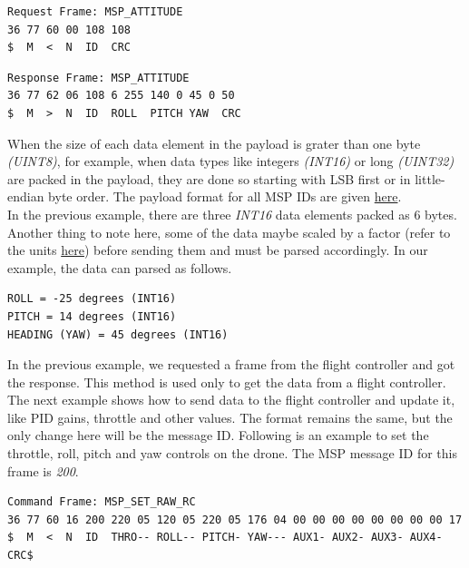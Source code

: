 \documentclass[a4paper,12pt,oneside]{book}
\begin{document}
\begin{verbatim}
Request Frame: MSP_ATTITUDE
36 77 60 00 108 108
$  M  <  N  ID  CRC
\end{verbatim}

\bigskip

\begin{verbatim}
Response Frame: MSP_ATTITUDE
36 77 62 06 108 6 255 140 0 45 0 50
$  M  >  N  ID  ROLL  PITCH YAW  CRC
\end{verbatim}

\clearpage

When the size of each data element in the payload is grater than one byte \textit{(UINT8)}, for example, when data types like integers \textit{(INT16)} or long \textit{(UINT32)} are packed in the payload, they are done so starting with LSB first or in little-endian byte order. The payload format for all MSP IDs are given \href{http://www.multiwii.com/wiki/index.php?title=Multiwii_Serial_Protocol}{here}.\\

In the previous example, there are three \textit{INT16} data elements packed as 6 bytes. Another thing to note here, some of the data maybe scaled by a factor (refer to the units \href{http://www.multiwii.com/wiki/index.php?title=Multiwii_Serial_Protocol}{here}) before sending them and must be parsed accordingly. In our example, the data can parsed as follows.\\

\begin{verbatim}
ROLL = -25 degrees (INT16)
PITCH = 14 degrees (INT16)
HEADING (YAW) = 45 degrees (INT16)
\end{verbatim}

\bigskip

In the previous example, we requested a frame from the flight controller and got the response. This method is used only to get the data from a flight controller. The next example shows how to send data to the flight controller and update it, like PID gains, throttle and other values. The format remains the same, but the only change here will be the message ID. Following is an example to set the throttle, roll, pitch and yaw controls on the drone. The MSP message ID for this frame is \textit{200}.\\

\begin{verbatim}
Command Frame: MSP_SET_RAW_RC
36 77 60 16 200 220 05 120 05 220 05 176 04 00 00 00 00 00 00 00 00 17
$  M  <  N  ID  THRO-- ROLL-- PITCH- YAW--- AUX1- AUX2- AUX3- AUX4- CRC$
\end{verbatim}
\end{document}
